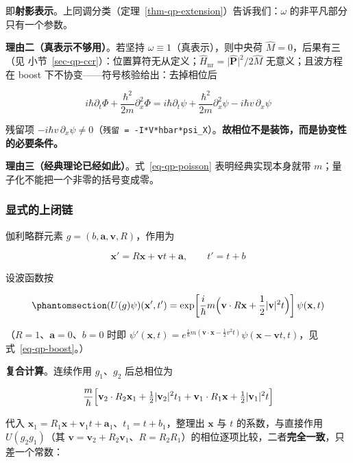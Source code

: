 \documentclass[
  chinese,
  a4paper,
  UTF8,
  12pt,
  oneside,
  openany]{ctexbook}
\theoremstyle{plain}
\theoremstyle{plain}
\theoremstyle{plain}
\theoremstyle{definition}
\theoremstyle{plain}
\theoremstyle{plain}
\theoremstyle{remark}
\begin{document}
即\textbf{射影表示}。上同调分类（定理~\ref{thm-qp-extension}）告诉我们：\(\omega\)
的非平凡部分只有一个参数。

\textbf{理由二（真表示不够用）}。若坚持
\(\omega\equiv1\)（真表示），则中央荷 \(\hat M=0\)，后果有三（见
小节~\ref{sec-qp-ccr}）：位置算符无从定义；\(\hat H_{\text{nr}}=\lvert\hat{\mathbf P}\rvert^{2}/2\hat M\)
无意义；且波方程在 boost 下不协变------符号核验给出：去掉相位后

\[
i\hbar\partial_t\Phi+\frac{\hbar^{2}}{2m}\partial_x^{2}\Phi
=i\hbar\partial_t\psi+\frac{\hbar^{2}}{2m}\partial_x^{2}\psi-i\hbar v\,\partial_x\psi
\]

残留项
\(-i\hbar v\,\partial_x\psi\neq0\)（\texttt{残留\ =\ -I*V*hbar*psi\_X}）。\textbf{故相位不是装饰，而是协变性的必要条件。}

\textbf{理由三（经典理论已经如此）}。式~\ref{eq-qp-poisson}
表明经典实现本身就带 \(m\)；量子化不能把一个非零的括号变成零。

\subsubsection{显式的上闭链}\label{ux663eux5f0fux7684ux4e0aux95edux94fe}

伽利略群元素 \(g=(b,\mathbf a,\mathbf v,R)\)，作用为

\[
\mathbf x'=R\mathbf x+\mathbf v t+\mathbf a,\qquad t'=t+b
\]

设波函数按

\begin{equation}\protect\phantomsection\label{eq-qp-Ug}{
(U(g)\psi)(\mathbf x',t')=\exp\!\left[\frac{i}{\hbar}m\Bigl(\mathbf v\cdot R\mathbf x+\frac{1}{2}\lvert\mathbf v\rvert^{2}t\Bigr)\right]\psi(\mathbf x,t)
}\end{equation}

（\(R=1\)、\(\mathbf a=0\)、\(b=0\) 时即
\(\psi'(\mathbf x,t)=e^{\frac{i}{\hbar}m(\mathbf v\cdot\mathbf x-\frac12 v^{2}t)}\psi(\mathbf x-\mathbf v t,t)\)，见
式~\ref{eq-qp-boost}。）

\textbf{复合计算}。连续作用 \(g_1\)、\(g_2\) 后总相位为

\[
\frac{m}{\hbar}\Bigl[\mathbf v_2\cdot R_2\mathbf x_1+\tfrac12\lvert\mathbf v_2\rvert^{2}t_1
+\mathbf v_1\cdot R_1\mathbf x+\tfrac12\lvert\mathbf v_1\rvert^{2}t\Bigr]
\]

代入
\(\mathbf x_1=R_1\mathbf x+\mathbf v_1t+\mathbf a_1\)、\(t_1=t+b_1\)，整理出
\(\mathbf x\) 与 \(t\) 的系数，与直接作用 \(U(g_2g_1)\)（其
\(\mathbf v=\mathbf v_2+R_2\mathbf v_1\)、\(R=R_2R_1\)）的相位逐项比较，二者\textbf{完全一致}，只差一个常数：
\end{document}
